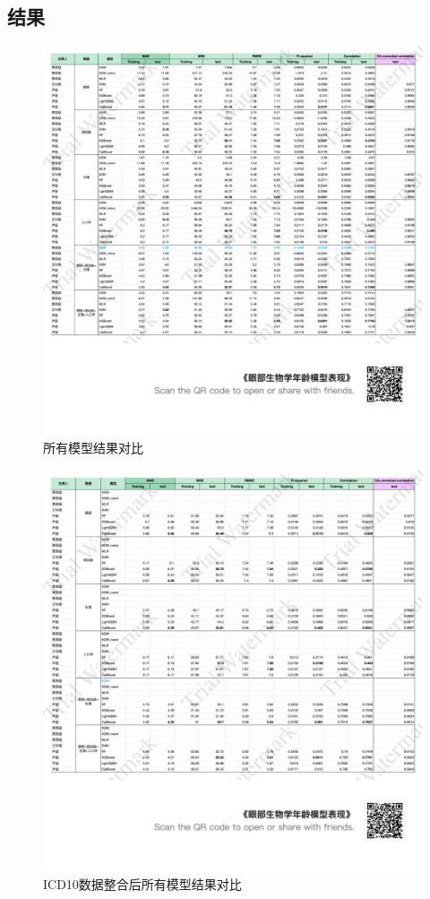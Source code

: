 \documentclass[UTF8]{report}
\theoremstyle{MyLineTheoremStyle} %
\theoremstyle{MyBlockTheoremStyle} %
\theoremstyle{MySubsubsectionStyle} %
\begin{document}
\subsection*{结果}
\begin{figure}[H]
    \centering
    \includegraphics[width=1.0\textwidth]{assets/eye_table.png}
    \caption{所有模型结果对比}
    \label{fig:model_comparison}
\end{figure}

\begin{figure}[H]
    \centering
    \includegraphics[width=1.0\textwidth]{assets/ICD10.png}
    \caption{ICD10数据整合后所有模型结果对比}
    \label{fig:model_comparison}
\end{figure}
\end{document}
